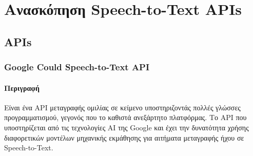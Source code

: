 \documentclass[oneside, 12pt]{book}
\begin{document}
\chapter{Ανασκόπηση Speech-to-Text APIs}
\label{ch:ανασκόπηση-speech-to-text-apis}
\section{APIs}
\label{sec:apis}
\subsection{Google Could Speech-to-Text API}
\label{subsec:google-speech-to-text}
\subsubsection{Περιγραφή}
Είναι ένα API μεταγραφής ομιλίας σε κείμενο υποστηριζοντάς πολλές γλώσσες προγραμματισμού, γεγονός που το καθιστά ανεξάρτητο πλατφόρμας. Το API που υποστηρίζεται από τις τεχνολογίες AI της Google και έχει την δυνατότητα χρήσης διαφορετικών μοντέλων μηχανικής εκμάθησης για αιτήματα μεταγραφής ήχου σε Speech-to-Text.
\end{document}

